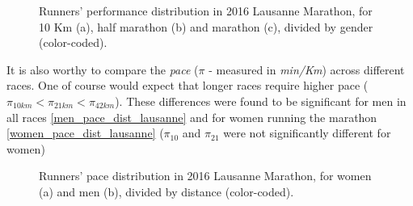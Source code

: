 \documentclass[fleqn,10pt]{wlscirep}
\begin{document}
\begin{figure}[h]
 			\caption{Runners' performance distribution in 2016 Lausanne Marathon, for 10 Km (a), half marathon (b) and marathon (c), divided by gender (color-coded).}
 		\end{figure}		 		
 	
 	
 	
 		It is  also worthy to compare the \textit{pace} ($ \pi $ - measured in \textit{min/Km}) across different races. 
 		One of course would expect that longer races require higher pace ($ \pi_{10km} < \pi_{21km} < \pi_{42km} $). 
 		These differences were found to be significant for men in all races  \ref{men_pace_dist_lausanne} and for women running the marathon \ref{women_pace_dist_lausanne} ($ \pi_{10}$ and  $ \pi_{21}  $ were not significantly different for women)
 		
		\begin{figure}[h]	
 			\centering
 			
 		
 			\caption{Runners' pace distribution in 2016 Lausanne Marathon, for women (a) and men (b), divided by distance (color-coded).}
 		\end{figure}	
 	
\end{document}
